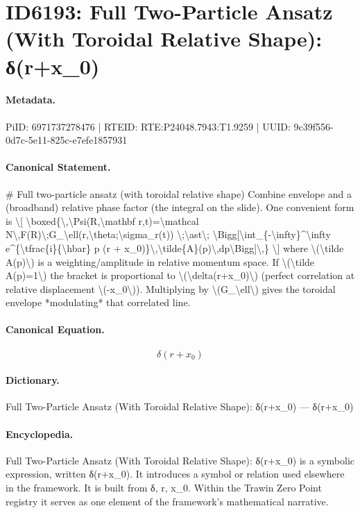 \section*{ID6193: Full Two-Particle Ansatz (With Toroidal Relative Shape): δ(r+x\_0)}
\paragraph{Metadata.}
PiID: 6971737278476 | RTEID: RTE:P24048.7943:T1.9259 | UUID: 9c39f556-0d7c-5e11-825c-e7efe1857931

\paragraph{Canonical Statement.}
\# Full two-particle ansatz (with toroidal relative shape) Combine envelope and a (broadband) relative phase factor (the integral on the slide). One convenient form is \textbackslash{}[ \textbackslash{}boxed\{\textbackslash{},\textbackslash{}Psi(R,\textbackslash{}mathbf r,t)=\textbackslash{}mathcal N\textbackslash{},F(R)\textbackslash{};G\_\textbackslash{}ell(r,\textbackslash{}theta;\textbackslash{}sigma\_r(t)) \textbackslash{};\textbackslash{}ast\textbackslash{}; \textbackslash{}Bigg[\textbackslash{}int\_\{-\textbackslash{}infty\}\textasciicircum{}\textbackslash{}infty e\textasciicircum{}\{\textbackslash{}tfrac\{i\}\{\textbackslash{}hbar\} p (r + x\_0)\}\textbackslash{},\textbackslash{}tilde\{A\}(p)\textbackslash{},dp\textbackslash{}Bigg]\textbackslash{},\} \textbackslash{}] where \textbackslash{}(\textbackslash{}tilde A(p)\textbackslash{}) is a weighting/amplitude in relative momentum space. If \textbackslash{}(\textbackslash{}tilde A(p)=1\textbackslash{}) the bracket is proportional to \textbackslash{}(\textbackslash{}delta(r+x\_0)\textbackslash{}) (perfect correlation at relative displacement \textbackslash{}(-x\_0\textbackslash{})). Multiplying by \textbackslash{}(G\_\textbackslash{}ell\textbackslash{}) gives the toroidal envelope *modulating* that correlated line.

\paragraph{Canonical Equation.}
\[
\delta(r+x_0)
\]

\paragraph{Dictionary.}
Full Two-Particle Ansatz (With Toroidal Relative Shape): δ(r+x\_0) — δ(r+x\_0)

\paragraph{Encyclopedia.}
Full Two-Particle Ansatz (With Toroidal Relative Shape): δ(r+x\_0) is a symbolic expression, written δ(r+x\_0). It introduces a symbol or relation used elsewhere in the framework. It is built from δ, r, x\_0. Within the Trawin Zero Point registry it serves as one element of the framework's mathematical narrative.
